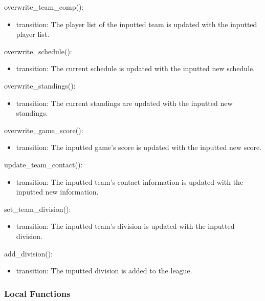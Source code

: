 \documentclass[12pt, titlepage]{article}
\begin{document}
\noindent overwrite\_team\_comp():
\begin{itemize}
\item transition: The player list of the inputted team is updated with the 
      inputted player list.
\end{itemize}

\noindent overwrite\_schedule():
\begin{itemize}
\item transition: The current schedule is updated with the inputted new
      schedule.
\end{itemize}

\noindent overwrite\_standings():
\begin{itemize}
\item transition: The current standings are updated with the inputted new
      standings.
\end{itemize}

\noindent overwrite\_game\_score():
\begin{itemize}
\item transition: The inputted game's score is updated with the inputted new
      score.
\end{itemize}

\noindent update\_team\_contact():
\begin{itemize}
\item transition: The inputted team's contact information is updated with the
      inputted new information.
\end{itemize}

\noindent set\_team\_division():
\begin{itemize}
\item transition: The inputted team's division is updated with the inputted
      division.
\end{itemize}

\noindent add\_division():
\begin{itemize}
\item transition: The inputted division is added to the league.
\end{itemize}

\subsubsection{Local Functions}

\end{document}
